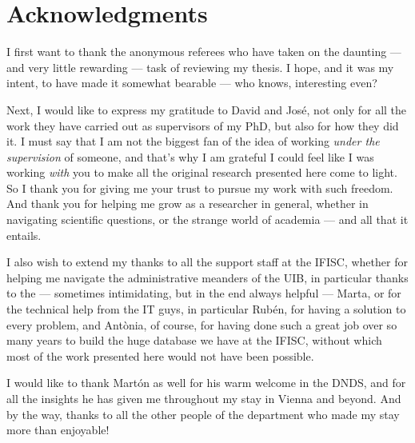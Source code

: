 \documentclass[../thesis.tex]{subfiles}
\begin{document}

\begingroup
\let\clearpage\relax
\let\cleardoublepage\relax
\let\cleardoublepage\relax
\chapter*{Acknowledgments}

I first want to thank the anonymous referees who have taken on the daunting --- and very little rewarding --- task of reviewing my thesis.
I hope, and it was my intent, to have made it somewhat bearable --- who knows, interesting even?

Next, I would like to express my gratitude to David and José, not only for all the work they have carried out as supervisors of my PhD, but also for how they did it.
I must say that I am not the biggest fan of the idea of working \emph{under the supervision} of someone, and that's why I am grateful I could feel like I was working \emph{with} you to make all the original research presented here come to light.
So I thank you for giving me your trust to pursue my work with such freedom.
And thank you for helping me grow as a researcher in general, whether in navigating scientific questions, or the strange world of academia --- and all that it entails.

I also wish to extend my thanks to all the support staff at the IFISC, whether for helping me navigate the administrative meanders of the UIB, in particular thanks to the --- sometimes intimidating, but in the end always helpful --- Marta, or for the technical help from the IT guys, in particular Rubén, for having a solution to every problem, and Antònia, of course, for having done such a great job over so many years to build the huge database we have at the IFISC, without which most of the work presented here would not have been possible.

I would like to thank Martón as well for his warm welcome in the DNDS, and for all the insights he has given me throughout my stay in Vienna and beyond.
And by the way, thanks to all the other people of the department who made my stay more than enjoyable!

\end{document}
